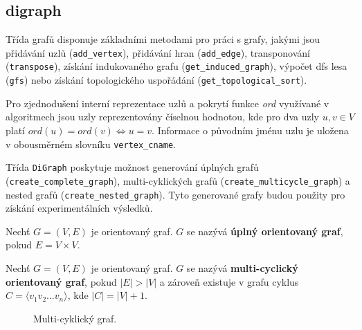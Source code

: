         \subsection{digraph}
            Třída grafů disponuje základními metodami pro práci s grafy, jakými jsou přidávání uzlů (\texttt{add\_vertex}), přidávání hran (\texttt{add\_edge}), transponování (\texttt{transpose}), získání indukovaného grafu (\texttt{get\_induced\_graph}), výpočet dfs lesa (\texttt{gfs}) nebo získání topologického uspořádání (\texttt{get\_topological\_sort}).

            Pro zjednodušení interní reprezentace uzlů a pokrytí funkce \textit{ord} využívané v algoritmech jsou uzly reprezentovány číselnou hodnotou, kde pro dva uzly $u, v \in V$ platí $ord(u) = ord(v) \iff u = v$. Informace o původním jménu uzlu je uložena v obousměrném slovníku \texttt{vertex\_cname}.

            Třída \texttt{DiGraph} poskytuje možnost generování úplných grafů (\texttt{create\_complete\_graph}), multi-cyklických grafů (\texttt{create\_multicycle\_graph}) a nested grafů (\texttt{create\_nested\_graph}). Tyto generované grafy budou použity pro získání experimentálních výsledků.

            \begin{definition}
                Nechť $G = (V, E)$ je orientovaný graf. $G$ se nazývá \textbf{úplný orientovaný graf}, pokud $E = V \times V$.
            \end{definition}

            \begin{definition}
                Nechť $G = (V, E)$ je orientovaný graf. $G$ se nazývá \textbf{multi-cyclický orientovaný graf}, pokud $|E| > |V|$ a zároveň existuje v grafu cyklus $C = \langle v_1v_2 \dots v_n \rangle$, kde $|C| = |V| + 1$.
            \end{definition}

            \newpage

            \begin{figure}
                \centering
                \caption{Multi-cyklický graf.}
            \end{figure}

